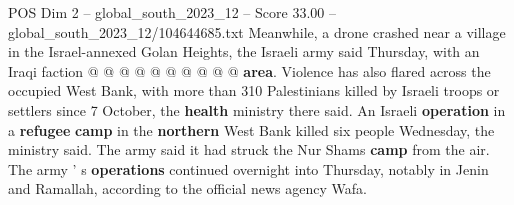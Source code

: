 \begin{textsample}{POS Dim 2 – global\_south\_2023\_12 – Score 33.00 – global\_south\_2023\_12/104644685.txt}
Meanwhile, a drone crashed near a village in the Israel-annexed Golan Heights, the Israeli army said Thursday, with an Iraqi faction @ @ @ @ @ @ @ @ @ @ \textbf{area}.
Violence has also flared across the occupied West Bank, with more than 310 Palestinians killed by Israeli troops or settlers since 7 October, the \textbf{health} ministry there said.
An Israeli \textbf{operation} in a \textbf{refugee} \textbf{camp} in the \textbf{northern} West Bank killed six people Wednesday, the ministry said.
The army said it had struck the Nur Shams \textbf{camp} from the air.
The army ' s \textbf{operations} continued overnight into Thursday, notably in Jenin and Ramallah, according to the official news agency Wafa.

\end{textsample}
